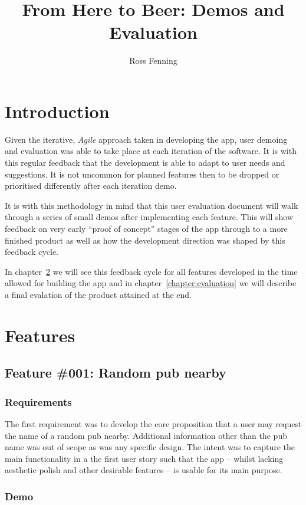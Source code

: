 \documentclass{report}
\title{From Here to Beer: Demos and Evaluation}
\author{Ross Fenning}
\begin{document}
\maketitle

\chapter{Introduction}

Given the iterative, \emph{Agile} approach taken in developing the app,
user demoing and evaluation was able to take place at each iteration of the
software. It is with this regular feedback that the development is able
to adapt to user needs and suggestions. It is not uncommon for planned
features then to be dropped or prioritised differently after each
iteration demo.

It is with this methodology in mind that this user evaluation document
will walk through a series of small demos after implementing each feature.
This will show feedback on very early ``proof of concept'' stages of
the app through to a more finished product as well as how the development
direction was shaped by this feedback cycle.

In chapter~\ref{chapter:features} we will see this feedback cycle for
all features developed in the time allowed for building the app and
in chapter~\ref{chapter:evaluation} we will describe a final evalation
of the product attained at the end.

\chapter{Features}
\label{chapter:features}
\section{Feature \#001: Random pub nearby}
\subsection{Requirements}
The first requirement was to develop the core proposition that a user may
request the name of a random pub nearby. Additional information other than
the pub name was out of scope as was any specific design. The intent was
to capture the main functionality in a the first user story such that
the app -- whilst lacking aesthetic polish and other desirable features --
is usable for its main purpose.

\subsection{Demo}
\end{document}
